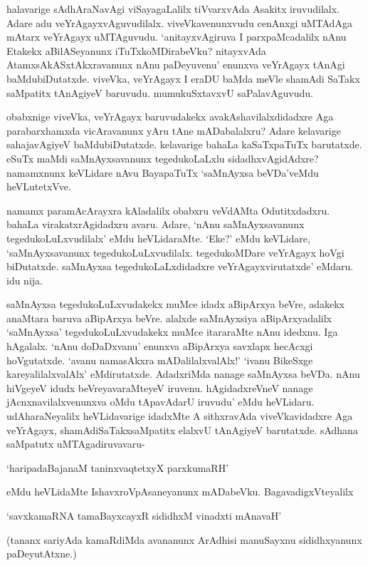 halavarige sAdhAraNavAgi viSayagaLalilx tiVvarxvAda Asakitx iruvudilalx. Adare adu veYrAgayxvAguvudilalx. viveVkavenunxvudu cenAnxgi uMTAdAga mAtarx veYrAgayx uMTAguvudu. `anitayxvAgiruva I parxpaMcadalilx nAnu Etakekx aBilASeyanunx iTuTxkoMDirabeVku? nitayxvAda AtamxsAkASxtAkxravanunx nAnu paDeyuvenu' enunxva veYrAgayx tAnAgi baMdubiDutatxde. viveVka, veYrAgayx I eraDU baMda meVle shamAdi SaTakx saMpatitx tAnAgiyeV baruvudu. mumukuSxtavxvU saPalavAguvudu.

obabxnige viveVka, veYrAgayx baruvudakekx avakAshavilalxdidadxre Aga parabarxhamxda vicAravanunx yAru tAne mADabalalxru? Adare kelavarige sahajavAgiyeV baMdubiDutatxde. kelavarige bahaLa kaSaTxpaTuTx barutatxde. eSuTx maMdi saMnAyxsavanunx tegedukoLaLxlu sidadhxvAgidAdxre? namamxnunx keVLidare nAvu BayapaTuTx `saMnAyxsa beVDa'veMdu heVLutetxVve.

namamx paramAcArayxra kAladalilx obabxru veVdAMta Odutitxdadxru. bahaLa virakatxrAgidadxru avaru. Adare, `nAnu saMnAyxsavanunx tegedukoLuLxvudilalx' eMdu heVLidaraMte. `Eke?' eMdu keVLidare, `saMnAyxsavanunx tegedukoLuLxvudilalx. tegedukoMDare veYrAgayx hoVgi biDutatxde. saMnAyxsa tegedukoLaLxdidadxre veYrAgayxvirutatxde' eMdaru. idu nija.

saMnAyxsa tegedukoLuLxvudakekx muMce idadx aBipArxya beVre, adakekx anaMtara baruva aBipArxya beVre. alalxde saMnAyxsiya aBipArxyadalilx `saMnAyxsa' tegedukoLuLxvudakekx muMce itararaMte nAnu idedxnu. Iga hAgalalx. `nAnu doDaDxvanu' enunxva aBipArxya savxlapx hecAcxgi hoVgutatxde. `avanu namasAkxra mADalilalxvalAlx!' `ivanu BikeSxge kareyalilalxvalAlx' eMdirutatxde. AdadxriMda nanage saMnAyxsa beVDa. nAnu hiVgeyeV idudx beVreyavaraMteyeV iruvenu. hAgidadxreVneV nanage jAcnxnavilalxvenunxva oMdu tApavAdarU iruvudu' eMdu heVLidaru. udAharaNeyalilx heVLidavarige idadxMte A sithxravAda viveVkavidadxre Aga veYrAgayx, shamAdiSaTakxsaMpatitx elalxvU tAnAgiyeV barutatxde. sAdhana saMpatutx uMTAgadiruvavaru-

\begin{shloka}
`haripadaBajanaM taninxvaqtetxyX parxkumaRH'
\end{shloka}

\noindent eMdu heVLidaMte IshavxroVpAsaneyanunx mADabeVku. BagavadigxVteyalilx 

\begin{shloka}
`savxkamaRNA tamaBayxcayxR sididhxM vinadxti mAnavaH'
\end{shloka}

(tananx sariyAda kamaRdiMda avananunx ArAdhisi manuSayxnu sididhxyanunx paDeyutAtxne.)

